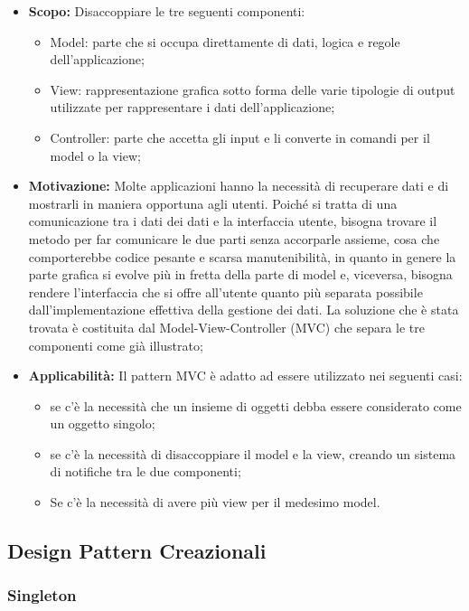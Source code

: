 \documentclass{scalatekids-article}
\begin{document}
\begin{itemize}
\item \textbf{Scopo:} Disaccoppiare le tre seguenti componenti:
  \begin{itemize}
  \item Model: parte che si occupa direttamente di dati, logica e regole dell'applicazione;
  \item View: rappresentazione grafica sotto forma delle varie tipologie di output utilizzate per rappresentare i dati dell'applicazione;
  \item Controller: parte che accetta gli input e li converte in comandi per il model o la view;
  \end{itemize}
\item \textbf{Motivazione:} Molte applicazioni hanno la necessità di recuperare dati e di mostrarli in maniera opportuna agli utenti. Poiché si tratta di una comunicazione tra i dati dei dati e la interfaccia utente, bisogna trovare il metodo per far comunicare le due parti senza accorparle assieme, cosa che comporterebbe codice pesante e scarsa manutenibilità, in quanto in genere la parte grafica si evolve più in fretta della parte di model e, viceversa, bisogna rendere l'interfaccia che si offre all'utente quanto più separata possibile dall'implementazione effettiva della gestione dei dati. La soluzione che è stata trovata è costituita dal  Model-View-Controller (MVC) che separa le tre componenti come già illustrato;
\item \textbf{Applicabilità:} Il pattern MVC è adatto ad essere utilizzato nei seguenti casi:
  \begin{itemize}
  \item se c'è la necessità che un insieme di oggetti debba essere considerato come un oggetto singolo;
  \item se c'è la necessità di disaccoppiare il model e la view, creando un sistema di notifiche tra le due componenti;
  \item Se c'è la necessità di avere più view per il medesimo model.
  \end{itemize}
\end{itemize}

\subsection{Design Pattern Creazionali}

\subsubsection{Singleton}
\end{document}
